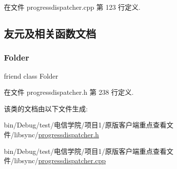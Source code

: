 在文件 progressdispatcher.\+cpp 第 123 行定义.



\subsection{友元及相关函数文档}
\mbox{\label{class_o_c_c_1_1_progress_dispatcher_a636accac57b57b9e90b136a583297044}} 
\subsubsection{\texorpdfstring{Folder}{Folder}}
{\footnotesize\ttfamily friend class Folder\hspace{0.3cm}{\ttfamily [friend]}}



在文件 progressdispatcher.\+h 第 238 行定义.



该类的文档由以下文件生成\+:\begin{DoxyCompactItemize}
\item 
bin/\+Debug/test/电信学院/项目1/原版客户端重点查看文件/libsync/\hyperlink{progressdispatcher_8h}{progressdispatcher.\+h}\item 
bin/\+Debug/test/电信学院/项目1/原版客户端重点查看文件/libsync/\hyperlink{progressdispatcher_8cpp}{progressdispatcher.\+cpp}\end{DoxyCompactItemize}
